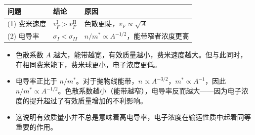 \begin{formulabox}[答案汇总]
\begin{center}
\begin{tabular}{lll}
\toprule
\textbf{问题} & \textbf{结论} & \textbf{原因} \\
\midrule
(1) 费米速度 & $v_F^{\text{I}}>v_F^{\text{II}}$ & 色散更陡，$v_F\propto\sqrt{A}$ \\
(2) 电导率 & $\sigma_I<\sigma_{II}$ & $n/m^*\propto A^{-1/2}$，能带窄者浓度更高 \\
\bottomrule
\end{tabular}
\end{center}
\end{formulabox}

\begin{insightbox}[物理图像]
\begin{itemize}
    \item 色散系数 $A$ 越大，能带越宽，有效质量越小，费米速度越大。但与此同时，在相同费米能下，费米球更小，电子浓度更低。
    \item 电导率正比于 $n/m^*$。对于抛物线能带，$n\propto A^{-3/2}$，$m^*\propto A^{-1}$，因此 $n/m^*\propto A^{-1/2}$。色散系数越小（能带越窄），电导率反而越大——因为电子浓度的提升超过了有效质量增加的不利影响。
    \item 这说明有效质量小并不总是意味着高电导率，电子浓度在输运性质中起着同等重要的作用。
\end{itemize}
\end{insightbox}
